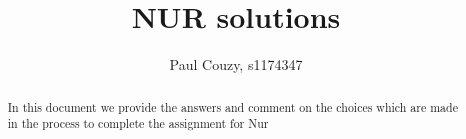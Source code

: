 \documentclass[a4paper,10pt]{article}
\title{NUR solutions}
\author{Paul Couzy, s1174347}
\begin{document}
\maketitle

\begin{abstract}
 In this document we provide the answers and comment on the choices which are made in the process to complete the assignment for Nur
\end{abstract}






\end{document}
